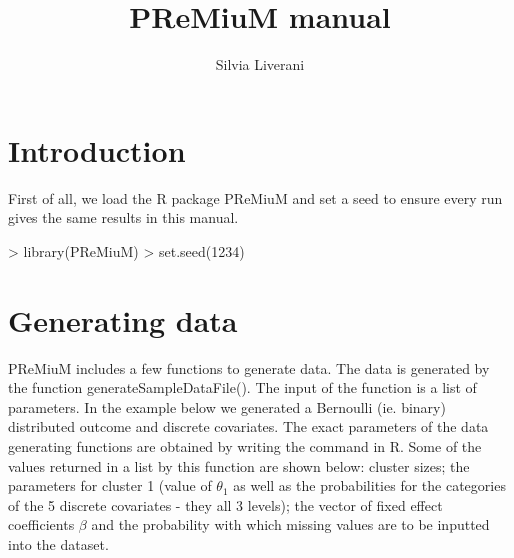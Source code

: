 \documentclass{article}
\begin{document}


\title{PReMiuM manual}
\author{Silvia Liverani}





\maketitle
\tableofcontents

\section{Introduction}
First of all, we load the R package PReMiuM and set a seed to ensure every run gives the same results in this manual. 

\begin{Schunk}
\begin{Sinput}
> library(PReMiuM)
> set.seed(1234)
\end{Sinput}
\end{Schunk}

\section{Generating data}

PReMiuM includes a few functions to generate data. The data is generated by the function generateSampleDataFile(). The input of the function is a list of parameters. In the example below we generated a Bernoulli (ie. binary) distributed outcome and discrete covariates. The exact parameters of the data generating functions are obtained by writing the command in R. Some of the values returned in a list by this function are shown below: cluster sizes; the parameters for cluster 1 (value of $\theta_1$ as well as the probabilities for the categories of the 5 discrete covariates - they all 3 levels); the vector of fixed effect coefficients $\beta$ and the probability with which missing values are to be inputted into the dataset.
\end{document}
